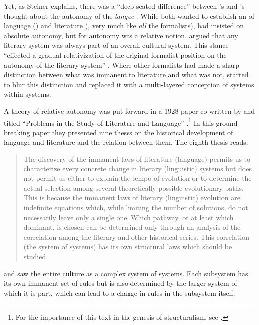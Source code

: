 \documentclass[output=paper]{langscibook}
\begin{document}
Yet, as Steiner explains, there was a ``deep-seated difference'' between {\Saussure}'s and {\Tynjanov}'s thought about the autonomy of the \emph{langue} \citep[112]{Steiner1984}. While both wanted to establish an  of language ({\Saussure}) and literature ({\Tynjanov}, very much like \emph{all} the formalists), {\Saussure} had insisted on absolute autonomy, but for {\Tynjanov} autonomy was a relative notion. {\Tynjanov} argued that any literary system was always part of an overall cultural system. This stance ``effected a gradual relativization of the original formalist position on the autonomy of the literary system'' \citep[111]{Steiner1984}. Where other formalists had made a sharp distinction between what was immanent to literature and what was not, {\Tynjanov} started to blur this distinction and replaced it with a multi-layered conception of systems within systems.

A theory of relative autonomy was put forward in a 1928 paper co-written by {\Tynjanov} and {\Jakobson} titled ``Problems in the Study of Literature and Language'' \citep{Tyjanov1928}.\footnote{For the importance of this text in the genesis of structuralism, see \citet[17]{Holenstein1975}.} In this ground-breaking paper they presented nine theses on the historical development of language and literature and the relation between them. The eighth thesis reads:

\begin{quotation}
The discovery of the immanent laws of literature (language) permits us to characterize every concrete change in literary (linguistic) systems but does not permit us either to explain the tempo of evolution or to determine the actual selection among several theoretically possible evolutionary paths. This is because the immanent laws of literary (linguistic) evolution are indefinite equations which, while limiting the number of solutions, do not necessarily leave only a single one. Which pathway, or at least which dominant, is chosen can be determined only through an analysis of the correlation among the literary and other historical series. This correlation (the system of systems) has its own structural laws which should be studied. \citep[Quotation given in English in][128]{Steiner1984}
\end{quotation}

{\Tynjanov} and {\Jakobson} saw the entire culture as a complex system of systems. Each subsystem has its own immanent set of rules but is also determined by the larger system of which it is part, which can lead to a change in rules in the subsystem itself.
\end{document}
